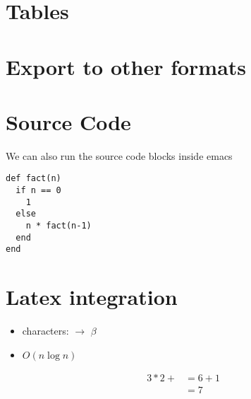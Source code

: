 \documentclass[11pt]{article}
\begin{document}
\section{Tables}
\label{sec:org30bf66f}

\section{Export to other formats}
\label{sec:orgc886f79}

\section{Source Code}
\label{sec:orgb971282}
We can also run the source code blocks inside emacs
\begin{verbatim}
def fact(n)
  if n == 0
    1
  else
    n * fact(n-1)
  end
end
\end{verbatim}

\section{Latex integration}
\label{sec:orgd5b633d}
\begin{itemize}
\item characters: \aplha \(\rightarrow\) \(\beta\)
\item \(O(n \log n)\)
\end{itemize}

\begin{align*}
 3 * 2 + &= 6 + 1 \\
   &= 7
\end{align*}
\end{document}
